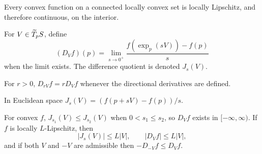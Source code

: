 \begin{lemma}
\label{lem:chow-iii-h21-convex-locally-lipschitz}
Every convex function on a connected locally convex set is locally Lipschitz, and
therefore continuous, on the interior.
\end{lemma}

\begin{definition}
\label{def:chow-iii-h22-directional-derivative}
For $V\in\widetilde T_pS$, define
\[
(D_Vf)(p)=\lim_{s\to0^+}\frac{f(\exp_p(sV))-f(p)}{s}
\]
when the limit exists.  The difference quotient is denoted $J_s(V)$.
\end{definition}

\begin{lemma}
\label{lem:chow-iii-h23-directional-homogeneity}
For $r>0$, $D_{rV}f=rD_Vf$ whenever the directional derivatives are defined.
\end{lemma}

\begin{remark}
\label{rem:chow-iii-h24-euclidean-difference-quotient}
In Euclidean space $J_s(V)=(f(p+sV)-f(p))/s$.
\end{remark}

\begin{lemma}
\label{lem:chow-iii-h25-directional-properties}
For convex $f$, $J_{s_1}(V)\le J_{s_2}(V)$ when $0<s_1\le s_2$, so $D_Vf$ exists
in $[-\infty,\infty)$.  If $f$ is locally $L$-Lipschitz, then
\[
|J_s(V)|\le L|V|,\qquad |D_Vf|\le L|V|,
\]
and if both $V$ and $-V$ are admissible then $-D_{-V}f\le D_Vf$.
\end{lemma}

